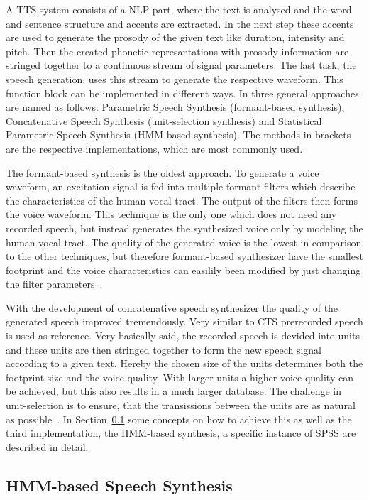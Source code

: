 A \ac{TTS} system consists of a \ac{NLP} part, where the text is analysed and the word and sentence structure and accents are extracted. In the next step these accents are used to generate the prosody of the given text like duration, intensity and pitch. Then the created phonetic represantations with prosody information are stringed together to a continuous stream of signal parameters. The last task, the speech generation, uses this stream to generate the respective waveform. This function block can be implemented in different ways. In \cite{hinterleitner:quality} three general approaches are named as follows: Parametric Speech Synthesis (formant-based synthesis), Concatenative Speech Synthesis (unit-selection synthesis) and Statistical Parametric Speech Synthesis (\ac{HMM}-based synthesis). The methods in brackets are the respective implementations, which are most commonly used. 

The formant-based synthesis is the oldest approach. To generate a voice waveform, an excitation signal is fed into multiple formant filters which describe the characteristics of the human vocal tract. The output of the filters then forms the voice waveform. This technique is the only one which does not need any recorded speech, but instead generates the synthesized voice only by modeling the human vocal tract. The quality of the generated voice is the lowest in comparison to the other techniques, but therefore formant-based synthesizer have the smallest footprint and the voice characteristics can easilily been modified by just changing the filter parameters~\cite{hinterleitner:quality}.

With the development of concatenative speech synthesizer the quality of the generated speech improved tremendously. Very similar to \ac{CTS} prerecorded speech is used as reference. Very basically said, the recorded speech is devided into units and these units are then stringed together to form the new speech signal according to a given text. Hereby the chosen size of the units determines both the footprint size and the voice quality. With larger units a higher voice quality can be achieved, but this also results in a much larger database. The challenge in unit-selection is to ensure, that the transissions between the units are as natural as possible~\cite{hinterleitner:quality}. In Section~\ref{subsec:hmmspeech} some concepts on how to achieve this as well as the third implementation, the \ac{HMM}-based synthesis, a specific instance of \ac{SPSS} are described in detail.

\subsection{\ac{HMM}-based Speech Synthesis}
\label{subsec:hmmspeech}

